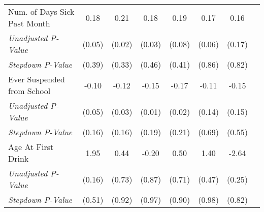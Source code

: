\begin{tabular}{l c c c c c c c}
Num. of Days Sick Past Month & 0.18 & 0.21 & 0.18 & 0.19 & 0.17 & 0.16 \\
\quad \textit{Unadjusted P-Value} & (0.05) & (0.02) & (0.03) & (0.08) & (0.06) & (0.17) \\
\quad \textit{Stepdown P-Value} & (0.39) & (0.33) & (0.46) & (0.41) & (0.86) & (0.82) \\
Ever Suspended from School & -0.10 & -0.12 & -0.15 & -0.17 & -0.11 & -0.15 \\
\quad \textit{Unadjusted P-Value} & (0.05) & (0.03) & (0.01) & (0.02) & (0.14) & (0.15) \\
\quad \textit{Stepdown P-Value} & (0.16) & (0.16) & (0.19) & (0.21) & (0.69) & (0.55) \\
Age At First Drink & 1.95 & 0.44 & -0.20 & 0.50 & 1.40 & -2.64 \\
\quad \textit{Unadjusted P-Value} & (0.16) & (0.73) & (0.87) & (0.71) & (0.47) & (0.25) \\
\quad \textit{Stepdown P-Value} & (0.51) & (0.92) & (0.97) & (0.90) & (0.98) & (0.82) \\
\bottomrule
\end{tabular}
